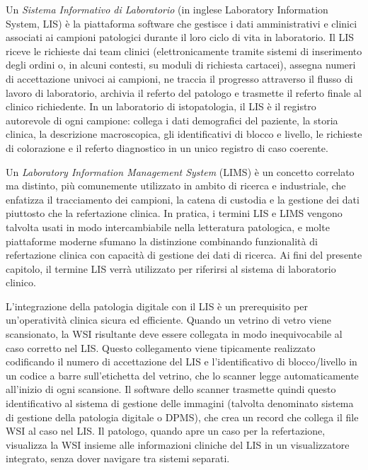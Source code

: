 Un \emph{Sistema Informativo di Laboratorio} (in inglese Laboratory Information System, LIS) è la piattaforma software che gestisce i dati amministrativi e clinici associati ai campioni patologici durante il loro ciclo di vita in laboratorio. Il LIS riceve le richieste dai team clinici (elettronicamente tramite sistemi di inserimento degli ordini o, in alcuni contesti, su moduli di richiesta cartacei), assegna numeri di accettazione univoci ai campioni, ne traccia il progresso attraverso il flusso di lavoro di laboratorio, archivia il referto del patologo e trasmette il referto finale al clinico richiedente. In un laboratorio di istopatologia, il LIS è il registro autorevole di ogni campione: collega i dati demografici del paziente, la storia clinica, la descrizione macroscopica, gli identificativi di blocco e livello, le richieste di colorazione e il referto diagnostico in un unico registro di caso coerente.

Un \emph{Laboratory Information Management System} (LIMS) è un concetto correlato ma distinto, più comunemente utilizzato in ambito di ricerca e industriale, che enfatizza il tracciamento dei campioni, la catena di custodia e la gestione dei dati piuttosto che la refertazione clinica. In pratica, i termini LIS e LIMS vengono talvolta usati in modo intercambiabile nella letteratura patologica, e molte piattaforme moderne sfumano la distinzione combinando funzionalità di refertazione clinica con capacità di gestione dei dati di ricerca. Ai fini del presente capitolo, il termine LIS verrà utilizzato per riferirsi al sistema di laboratorio clinico.

L'integrazione della patologia digitale con il LIS è un prerequisito per un'operatività clinica sicura ed efficiente. Quando un vetrino di vetro viene scansionato, la WSI risultante deve essere collegata in modo inequivocabile al caso corretto nel LIS. Questo collegamento viene tipicamente realizzato codificando il numero di accettazione del LIS e l'identificativo di blocco/livello in un codice a barre sull'etichetta del vetrino, che lo scanner legge automaticamente all'inizio di ogni scansione. Il software dello scanner trasmette quindi questo identificativo al sistema di gestione delle immagini (talvolta denominato sistema di gestione della patologia digitale o DPMS), che crea un record che collega il file WSI al caso nel LIS. Il patologo, quando apre un caso per la refertazione, visualizza la WSI insieme alle informazioni cliniche del LIS in un visualizzatore integrato, senza dover navigare tra sistemi separati.

